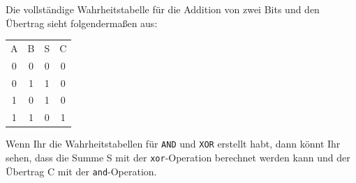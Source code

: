       Die vollständige Wahrheitstabelle für die Addition von zwei Bits und den Übertrag sieht folgendermaßen aus:
      \begin{center}
        \begin{tabular}{c|c!{\vrule width 1pt}c|c}
        A & B & S & C \\\Xhline{1pt}
        0 & 0 & 0 & 0 \\
        0 & 1 & 1 & 0 \\
        1 & 0 & 1 & 0 \\
        1 & 1 & 0 & 1 \\
        \end{tabular}
      \end{center}
      Wenn Ihr die Wahrheitstabellen für \texttt{AND} und \texttt{XOR} erstellt habt, dann könnt Ihr sehen, dass die Summe S mit der \texttt{xor}-Operation berechnet werden kann und der Übertrag C mit der \texttt{and}-Operation.
